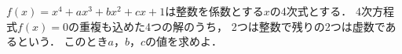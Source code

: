 \documentclass[../../main.tex]{subfiles}
\begin{document}
$f(x)=x^4+ax^3+bx^2+cx+1$は整数を係数とする$x$の4次式とする．
4次方程式$f(x)=0$の重複も込めた4つの解のうち，
2つは整数で残りの2つは虚数であるという．
このとき$a$，$b$，$c$の値を求めよ．
\end{document}
